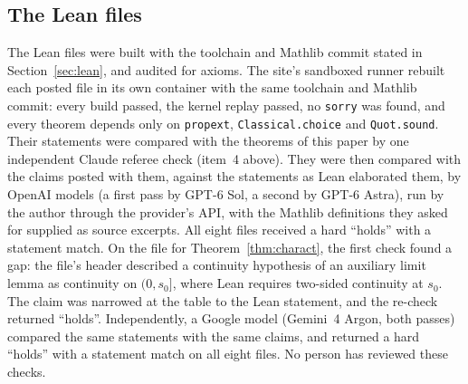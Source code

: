 \subsection{The Lean files}\label{sec:leanchecks}
The Lean files were built with the toolchain and Mathlib commit stated in Section~\ref{sec:lean}, and audited for axioms. The site's sandboxed runner rebuilt each posted file in its own container with the same toolchain and Mathlib commit: every build passed, the kernel replay passed, no \texttt{sorry} was found, and every theorem depends only on \texttt{propext}, \texttt{Classical.choice} and \texttt{Quot.sound}. Their statements were compared with the theorems of this paper by one independent Claude referee check (item~4 above). They were then compared with the claims posted with them, against the statements as Lean elaborated them, by OpenAI models (a first pass by GPT-6 Sol, a second by GPT-6 Astra), run by the author through the provider's API, with the Mathlib definitions they asked for supplied as source excerpts. All eight files received a hard ``holds'' with a statement match. On the file for Theorem~\ref{thm:charact}, the first check found a gap: the file's header described a continuity hypothesis of an auxiliary limit lemma as continuity on $(0,s_0]$, where Lean requires two-sided continuity at $s_0$. The claim was narrowed at the table to the Lean statement, and the re-check returned ``holds''. Independently, a Google model (Gemini~4 Argon, both passes) compared the same statements with the same claims, and returned a hard ``holds'' with a statement match on all eight files. No person has reviewed these checks.

